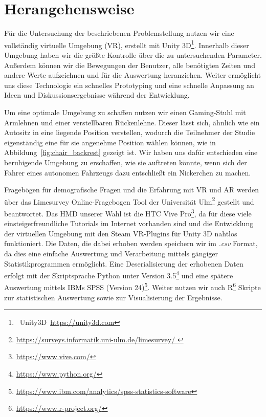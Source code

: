\section{Herangehensweise}\label{sec:approach}  

Für die Untersuchung der beschriebenen Problemstellung nutzen wir eine vollständig virtuelle Umgebung (VR), erstellt mit Unity 3D\footnote{~Unity3D~\url{https://unity3d.com}}. Innerhalb dieser Umgebung haben wir die größte Kontrolle über die zu untersuchenden Parameter. Außerdem können wir die Bewegungen der Benutzer, alle benötigten Zeiten und andere Werte aufzeichnen und für die Auswertung heranziehen. Weiter ermöglicht uns diese Technologie ein schnelles Prototyping und eine schnelle Anpassung an Ideen und Diskussionsergebnisse während der Entwicklung.

Um eine optimale Umgebung zu schaffen nutzen wir einen Gaming-Stuhl mit Armlehnen und einer verstellbaren Rückenlehne. Dieser lässt sich, ähnlich wie ein Autositz in eine liegende Position verstellen, wodurch die Teilnehmer der Studie eigenständig eine für sie angenehme Position wählen können, wie in Abbildung~\ref{fig:chair_backrest} gezeigt ist. Wir haben uns dafür entschieden eine beruhigende Umgebung zu erschaffen, wie sie auftreten könnte, wenn sich der Fahrer eines autonomen Fahrzeugs dazu entschließt ein Nickerchen zu machen.

Fragebögen für demografische Fragen und die Erfahrung mit VR und AR werden über das Limesurvey Online-Fragebogen Tool der Universität Ulm\footnote{\url{https://surveys.informatik.uni-ulm.de/limesurvey/
}} gestellt und beantwortet.
Das HMD unserer Wahl ist die HTC Vive Pro\footnote{\url{https://www.vive.com/}}, da für diese viele einsteigerfreundliche Tutorials im Internet vorhanden sind und die Entwicklung der virtuellen Umgebung mit den Steam VR-Plugins für Unity 3D nahtlos funktioniert. Die Daten, die dabei erhoben werden speichern wir im \textit{.csv} Format, da dies eine einfache Auswertung und Verarbeitung mittels gängiger Statistikprogrammen ermöglicht. Eine Deserialisierung der erhobenen Daten erfolgt mit der Skriptsprache Python unter Version 3.5\footnote{\url{https://www.python.org/}} und eine spätere Auswertung mittels IBMs SPSS (Version 24)\footnote{\url{https://www.ibm.com/analytics/spss-statistics-software}}. Weiter nutzen wir auch R\footnote{\url{https://www.r-project.org/}} Skripte zur statistischen Auswertung sowie zur Visualisierung der Ergebnisse.
